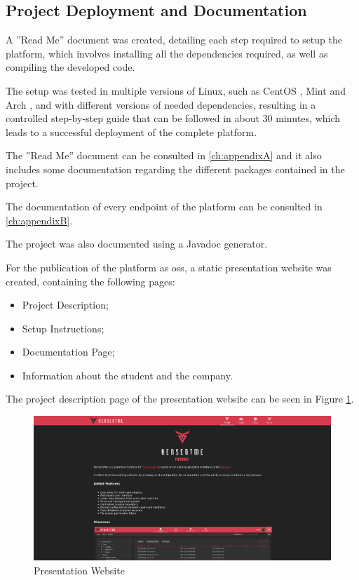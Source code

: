 \subsection{Project Deployment and Documentation}

A ''Read Me'' document was created, detailing each step required to setup the platform, which involves installing all the dependencies required, as well as compiling the developed code.

The setup was tested in multiple versions of Linux,  such as CentOS \cite{centos}, Mint \cite{mint} and Arch \cite{arch}, and with different versions of needed dependencies, 
resulting in a controlled step-by-step guide that can be followed in about 30 minutes, which leads to a successful deployment of the complete platform.

The ''Read Me'' document can be consulted in \autoref{ch:appendixA} and it also includes some documentation regarding the different packages contained in the project.

The documentation of every endpoint of the platform can be consulted in \autoref{ch:appendixB}.

The project was also documented using a Javadoc \cite{javadoc} generator.

For the publication of the platform as \acrshort{oss}, a static presentation website was created, containing the following pages:

\begin{itemize}
 \item Project Description;
 \item Setup Instructions;
 \item Documentation Page;
 \item Information about the student and the company.
\end{itemize}

The project description page of the presentation website can be seen in Figure \ref{fig:website}.

\begin{figure}[ht]
 \centering
 \includegraphics[width=1\linewidth]{imgs/website.png}
 \caption{Presentation Website}
 \label{fig:website}
\end{figure}

